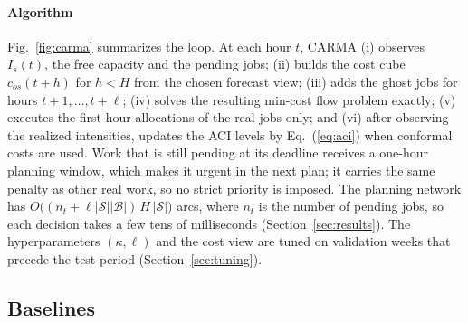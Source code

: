 \paragraph{Algorithm} Fig.~\ref{fig:carma} summarizes the loop. At each hour $t$, CARMA (i) observes $I_s(t)$, the free capacity and the pending jobs; (ii) builds the cost cube $c_{os}(t+h)$ for $h<H$ from the chosen forecast view; (iii) adds the ghost jobs for hours $t+1,\dots,t+\ell$; (iv) solves the resulting min-cost flow problem exactly; (v) executes the first-hour allocations of the real jobs only; and (vi) after observing the realized intensities, updates the ACI levels by Eq.~(\ref{eq:aci}) when conformal costs are used. Work that is still pending at its deadline receives a one-hour planning window, which makes it urgent in the next plan; it carries the same penalty as other real work, so no strict priority is imposed. The planning network has $O\big((n_t+\ell|\mathcal{S}||\mathcal{B}|)\,H\,|\mathcal{S}|\big)$ arcs, where $n_t$ is the number of pending jobs, so each decision takes a few tens of milliseconds (Section~\ref{sec:results}). The hyperparameters $(\kappa,\ell)$ and the cost view are tuned on validation weeks that precede the test period (Section~\ref{sec:tuning}).

\subsection{Baselines}\label{sec:baselines}

